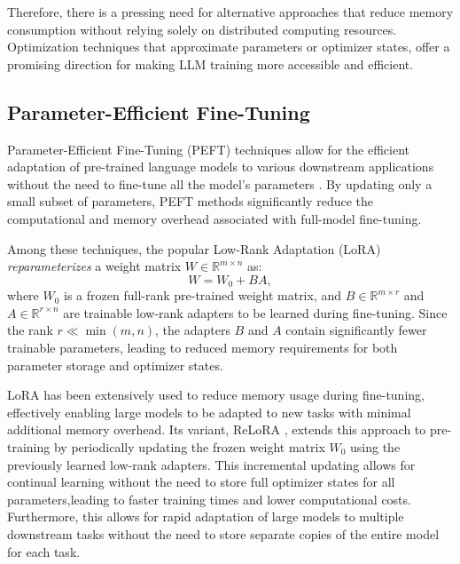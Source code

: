 Therefore, there is a pressing need for alternative approaches that reduce memory consumption without relying solely on distributed computing resources. Optimization techniques that approximate parameters or optimizer states, offer a promising direction for making LLM training more accessible and efficient.

\def\rr{\mathbb{R}}

\subsection{Parameter-Efficient Fine-Tuning}

Parameter-Efficient Fine-Tuning (PEFT) techniques allow for the efficient adaptation of pre-trained language models to various downstream applications without the need to fine-tune all the model's parameters \citep{dingDeltaTuningComprehensive2022}. By updating only a small subset of parameters, PEFT methods significantly reduce the computational and memory overhead associated with full-model fine-tuning.

Among these techniques, the popular Low-Rank Adaptation (LoRA) \citep{huLoRALowRankAdaptation2021} \emph{reparameterizes} a weight matrix $W \in \mathbb{R}^{m \times n}$ as:
\begin{equation}
    W = W_0 + BA,
\end{equation}
where $W_0$ is a frozen full-rank pre-trained weight matrix, and $B \in \mathbb{R}^{m \times r}$ and $A \in \mathbb{R}^{r \times n}$ are trainable low-rank adapters to be learned during fine-tuning. Since the rank $r \ll \min(m, n)$, the adapters $B$ and $A$ contain significantly fewer trainable parameters, leading to reduced memory requirements for both parameter storage and optimizer states.

LoRA has been extensively used to reduce memory usage during fine-tuning, effectively enabling large models to be adapted to new tasks with minimal additional memory overhead. Its variant, ReLoRA \citep{lialinReLoRAHighRankTraining2023}, extends this approach to pre-training by periodically updating the frozen weight matrix $W_0$ using the previously learned low-rank adapters. This incremental updating allows for continual learning without the need to store full optimizer states for all parameters,leading to faster training times and lower computational costs. Furthermore, this allows for rapid adaptation of large models to multiple downstream tasks without the need to store separate copies of the entire model for each task.

